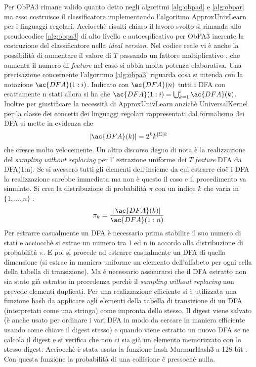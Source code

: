 Per \ac{ObPA}3 rimane valido quanto detto negli algoritmi \ref{alg:obpad} e \ref{alg:obpar} ma esso costruisce il classificatore implementando l'algoritmo ApproxUnivLearn per i linguaggi regolari. Acciocchè risulti chiaro il lavoro svolto si rimanda allo pseudocodice \ref{alg:obpa3} di alto livello e autoesplicativo per \ac{ObPA}3 inerente la costruzione del classificatore nella \textit{ideal version}. Nel codice reale vi è anche la possibilità di aumentare il valore di $T$ passando un fattore moltiplicativo , che aumenta il numero di \textit{feature} nel caso si abbia molta potenza elaborativa. Una  precisazione concernente l'algoritmo \ref{alg:obpa3} riguarda cosa si intenda con la notazione $\ac{DFA}(1:i)$. Indicato con $\ac{DFA}(n)$ tutti i \ac{DFA} con esattamente n stati allora si ha che  $\ac{DFA}(1:i) = \bigcup_{k=1}^{i}\ac{DFA}(k)$. Inoltre per giustificare la necessità di ApproxUnivLearn anzichè UniversalKernel  per la classe dei concetti dei linguaggi regolari rappresentati dal formalismo dei \ac{DFA} si mette in evidenza che 
\begin{equation*}
|\ac{DFA}(k)| = 2^{k}k^{|\Sigma|k}
\end{equation*}
che cresce molto velocemente. Un altro discorso degno di nota è la realizzazione del \textit{sampling without replacing} per l' estrazione uniforme dei $T$ \textit{feature} \ac{DFA} da \ac{DFA}(1:n). Se si avessero tutti gli elementi dell'insieme da cui estrarre cioè i \ac{DFA}  la realizzazione sarebbe immediata ma non è questo il caso e il procedimento va simulato. Si crea la distribuzione di probabilità $\pi$ con un indice $k$ che varia in $\{1,\dots,n\}$ :
\begin{equation*}
\pi_{k} = \frac{|\ac{DFA}(k)|}{\ac{DFA}(1:n)}
\end{equation*}
Per estrarre casualmente un \ac{DFA} è necessario prima stabilire il suo numero di stati e acciocchè si estrae un numero tra 1 ed n in accordo alla distribuzione di probabilità $\pi$. E poi si procede ad estrarre casualmente un \ac{DFA} di quella dimensione (si estrae in maniera uniforme un elemento dell'alfabeto per ogni cella della tabella di transizione). Ma è necessario assicurarsi che il \ac{DFA} estratto non sia stato già estratto in precedenza perchè il  \textit{sampling without replacing} non prevede elementi duplicati. Per una realizzazione efficiente si è utilizzata una funzione hash da applicare agli elementi della tabella di transizione di un \ac{DFA} (interpretati come una stringa) come impronta dello stesso. Il digest viene salvato (è anche usato per ordinare i vari \ac{DFA} in modo da cercare in maniera efficiente usando come chiave il digest stesso) e quando viene estratto un nuovo \ac{DFA} se ne calcola il digest e si verifica che non ci sia già un elemento memorizzato con lo stesso digest. Acciocchè è stata usata la funzione hash  MurmurHash3 a 128 bit \cite{AppleHash}. Con questa funzione la probabilità di una collisione è pressoché nulla.\\
